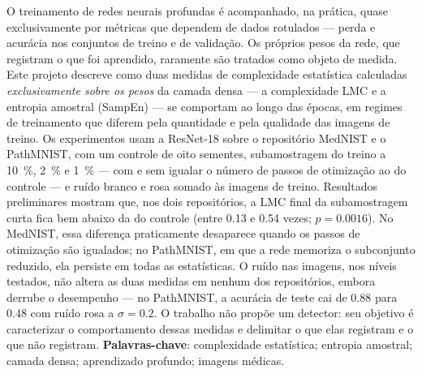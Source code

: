 \documentclass[
  12pt,
  openright,
  oneside,
  a4paper,
  english,
  brazil,
]{abntex2}
\begin{document}
\frenchspacing

\imprimircapa
\imprimirfolhaderosto

\begin{resumo}
O treinamento de redes neurais profundas é acompanhado, na prática, quase
exclusivamente por métricas que dependem de dados rotulados --- perda e
acurácia nos conjuntos de treino e de validação. Os próprios pesos da rede,
que registram o que foi aprendido, raramente são tratados como objeto de
medida. Este projeto descreve como duas medidas de complexidade estatística
calculadas \emph{exclusivamente sobre os pesos} da camada densa --- a
complexidade LMC e a entropia amostral (SampEn) --- se comportam ao longo das
épocas, em regimes de treinamento que diferem pela quantidade e pela qualidade
das imagens de treino. Os experimentos usam a ResNet-18 sobre o repositório
MedNIST e o PathMNIST, com um controle de oito sementes, subamostragem do treino a
\SI{10}{\percent}, \SI{2}{\percent} e \SI{1}{\percent} --- com e sem
igualar o número de passos de otimização ao do controle --- e ruído branco e
rosa somado às imagens de treino. Resultados preliminares mostram que, nos
dois repositórios, a LMC final da subamostragem curta fica bem abaixo da do
controle (entre \num{0,13} e \num{0,54} vezes; $p = \num{0,0016}$). No MedNIST,
essa diferença praticamente desaparece quando os passos de otimização são
igualados; no PathMNIST, em que a rede memoriza o subconjunto reduzido, ela
persiste em todas as estatísticas. O ruído nas imagens, nos níveis testados,
não altera as duas medidas em nenhum dos repositórios, embora derrube o
desempenho --- no PathMNIST, a acurácia de teste cai de \num{0,88} para
\num{0,48} com ruído rosa a $\sigma = \num{0,2}$. O trabalho não propõe
um detector: seu objetivo é caracterizar o comportamento dessas medidas e
delimitar o que elas registram e o que não registram.
\textbf{Palavras-chave}: complexidade estatística; entropia amostral;
camada densa; aprendizado profundo; imagens médicas.
\end{resumo}

\tableofcontents

\textual





\postextual

\end{document}

